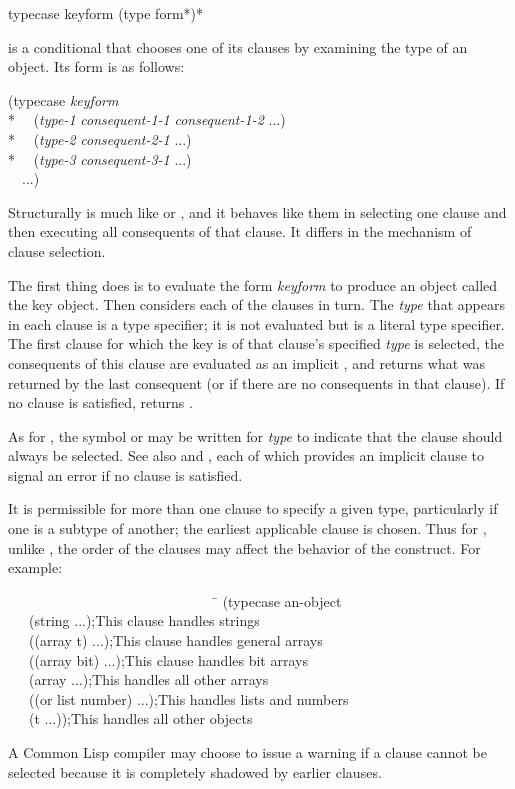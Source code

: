 \begin{defmac}
typecase keyform {(type {form}*)}*

 is a conditional that chooses one of its clauses by
examining the type of an object.
Its form is as follows:
\begin{lisp}
(typecase \emph{keyform} \\*
~~(\emph{type-1} \emph{consequent-1-1} \emph{consequent-1-2} ...) \\*
~~(\emph{type-2} \emph{consequent-2-1} ...) \\*
~~(\emph{type-3} \emph{consequent-3-1} ...) \\
~~...)
\end{lisp}
Structurally  is much like  or ,
and it behaves like them
in selecting one clause and then executing all consequents of that clause.
It differs in the mechanism of clause selection.

The first thing  does is to evaluate the form \emph{keyform}
to produce an object called the key object.
Then  considers
each of the clauses in turn.  The \emph{type} that appears
in each clause is a type specifier; it is not evaluated
but is a literal type specifier.
The first clause for which the key
is of that clause's specified \emph{type}
is selected, the consequents of this
clause are evaluated as an implicit ,
and  returns what was returned by the last
consequent (or {\false} if there are no consequents in that clause).
If no clause is satisfied,  returns {\false}.

As for , the symbol {\true} or  may be written
for \emph{type} to indicate that the clause should always be selected.
See also  and , each of which provides
an implicit  clause to signal an error if no clause
is satisfied.

It is permissible for more than one clause to specify a given type,
particularly if one is a subtype of another; the earliest applicable
clause is chosen.  Thus for , unlike , the order
of the clauses may affect the behavior of the construct.
For example:
\begin{lisp}
~~~~~~~~~~~~~~~~~~~~~~~~~~~~~~\=\kill
(typecase an-object \\
~~~(string ...)\>;\textrm{This clause handles strings} \\
~~~((array t) ...)\>;\textrm{This clause handles general arrays} \\
~~~((array bit) ...)\>;\textrm{This clause handles bit arrays} \\
~~~(array ...)\>;\textrm{This handles all other arrays} \\
~~~((or list number) ...)\>;\textrm{This handles lists and numbers} \\
~~~(t ...))\>;\textrm{This handles all other objects}
\end{lisp}
A Common Lisp compiler may choose to issue a warning if
a clause cannot be selected because it is completely shadowed by
earlier clauses.
\end{defmac}

